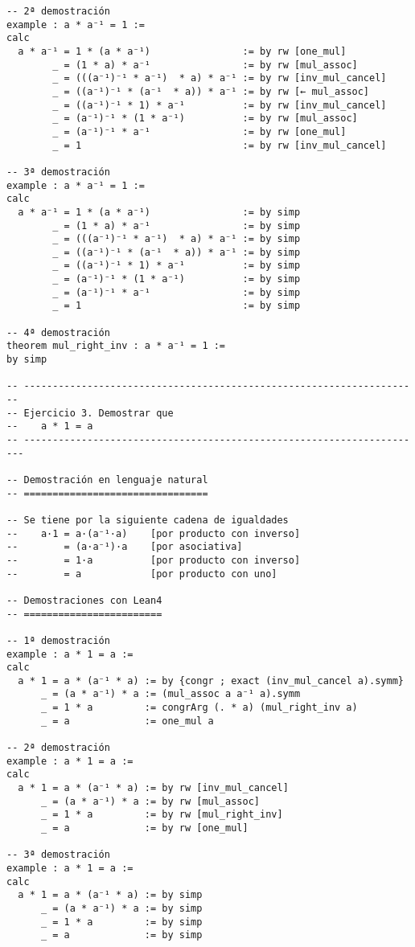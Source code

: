 \begin{verbatim}
-- 2ª demostración
example : a * a⁻¹ = 1 :=
calc
  a * a⁻¹ = 1 * (a * a⁻¹)                := by rw [one_mul]
        _ = (1 * a) * a⁻¹                := by rw [mul_assoc]
        _ = (((a⁻¹)⁻¹ * a⁻¹)  * a) * a⁻¹ := by rw [inv_mul_cancel]
        _ = ((a⁻¹)⁻¹ * (a⁻¹  * a)) * a⁻¹ := by rw [← mul_assoc]
        _ = ((a⁻¹)⁻¹ * 1) * a⁻¹          := by rw [inv_mul_cancel]
        _ = (a⁻¹)⁻¹ * (1 * a⁻¹)          := by rw [mul_assoc]
        _ = (a⁻¹)⁻¹ * a⁻¹                := by rw [one_mul]
        _ = 1                            := by rw [inv_mul_cancel]

-- 3ª demostración
example : a * a⁻¹ = 1 :=
calc
  a * a⁻¹ = 1 * (a * a⁻¹)                := by simp
        _ = (1 * a) * a⁻¹                := by simp
        _ = (((a⁻¹)⁻¹ * a⁻¹)  * a) * a⁻¹ := by simp
        _ = ((a⁻¹)⁻¹ * (a⁻¹  * a)) * a⁻¹ := by simp
        _ = ((a⁻¹)⁻¹ * 1) * a⁻¹          := by simp
        _ = (a⁻¹)⁻¹ * (1 * a⁻¹)          := by simp
        _ = (a⁻¹)⁻¹ * a⁻¹                := by simp
        _ = 1                            := by simp

-- 4ª demostración
theorem mul_right_inv : a * a⁻¹ = 1 :=
by simp

-- ---------------------------------------------------------------------
-- Ejercicio 3. Demostrar que
--    a * 1 = a
-- ----------------------------------------------------------------------

-- Demostración en lenguaje natural
-- ================================

-- Se tiene por la siguiente cadena de igualdades
--    a·1 = a·(a⁻¹·a)    [por producto con inverso]
--        = (a·a⁻¹)·a    [por asociativa]
--        = 1·a          [por producto con inverso]
--        = a            [por producto con uno]

-- Demostraciones con Lean4
-- ========================

-- 1ª demostración
example : a * 1 = a :=
calc
  a * 1 = a * (a⁻¹ * a) := by {congr ; exact (inv_mul_cancel a).symm}
      _ = (a * a⁻¹) * a := (mul_assoc a a⁻¹ a).symm
      _ = 1 * a         := congrArg (. * a) (mul_right_inv a)
      _ = a             := one_mul a

-- 2ª demostración
example : a * 1 = a :=
calc
  a * 1 = a * (a⁻¹ * a) := by rw [inv_mul_cancel]
      _ = (a * a⁻¹) * a := by rw [mul_assoc]
      _ = 1 * a         := by rw [mul_right_inv]
      _ = a             := by rw [one_mul]

-- 3ª demostración
example : a * 1 = a :=
calc
  a * 1 = a * (a⁻¹ * a) := by simp
      _ = (a * a⁻¹) * a := by simp
      _ = 1 * a         := by simp
      _ = a             := by simp


\end{verbatim}
